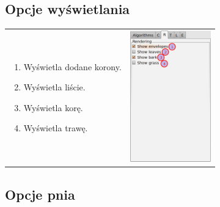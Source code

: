 \subsection{Opcje wyświetlania}
\begin{tabular}{lr}
\parbox[c]{95mm}{
\begin{enumerate}
	\item {Wyświetla dodane korony.}
	\item {Wyświetla liście.}
	\item {Wyświetla korę.}
	\item {Wyświetla trawę.}
\end{enumerate}
} &
\parbox[c]{35mm}{
\includegraphics[width=35mm]{images/gui/rendering_panel.png}
}\\
\end{tabular}

\subsection{Opcje pnia}

